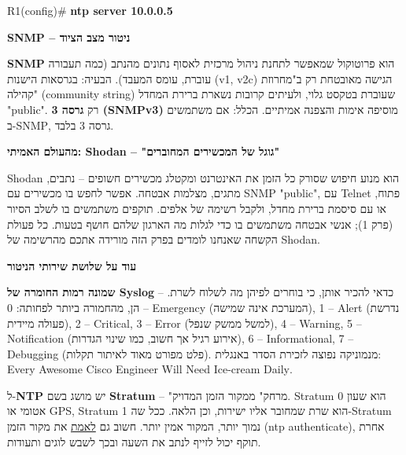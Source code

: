 \documentclass[11pt]{article}
\newcommand{\enLR}[1]{\textenglish{#1}}
\newcommand{\code}[1]{\textenglish{\codefont #1}}
\newcommand{\subheading}[1]{\vskip6pt{\bfseries\color{h3}#1\par}\vskip2pt}
\newcommand{\boxtitle}[1]{{\bfseries\color{boxti}#1}}
\newenvironment{storybox}{\colorlet{boxti}{stoti}\begin{mdframed}[backgroundcolor=stobg,linecolor=stofr,rightline=true,leftline=false,topline=false,bottomline=false,linewidth=2pt,innertopmargin=6pt,innerbottommargin=6pt,innerleftmargin=8pt,innerrightmargin=8pt,skipabove=6pt,skipbelow=6pt]}{\end{mdframed}}
\begin{document}
\begin{codebox}\begin{english}\codefont\footnotesize\color{cfg}\setlength{\parindent}{0pt}
R1(config)\# \textcolor{cbold}{\textbf{ntp server 10.0.0.5}}
\end{english}\end{codebox}

\subheading{\enLR{SNMP} – ניטור מצב הציוד}

\textbf{\enLR{SNMP}} הוא פרוטוקול שמאפשר לתחנת ניהול מרכזית לאסוף נתונים מהנתב (כמה תעבורה עוברת, עומס המעבד). הבעיה: בגרסאות הישנות \enLR{(v1, v2c)} הגישה מאובטחת רק ב"מחרוזת קהילה" \enLR{(community string)} שעוברת בטקסט גלוי, ולעיתים קרובות נשארת ברירת המחדל "\enLR{public".} רק \textbf{גרסה \enLR{3 (SNMPv3)}} מוסיפה אימות והצפנה אמיתיים. הכלל: אם משתמשים ב-\enLR{SNMP}, גרסה \enLR{3} בלבד.\par

\begin{storybox}\boxtitle{מהעולם האמיתי: \enLR{Shodan} – "גוגל של המכשירים המחוברים"}\par  \enLR{Shodan} הוא מנוע חיפוש שסורק כל הזמן את האינטרנט ומקטלג מכשירים חשופים – נתבים, מתגים, מצלמות אבטחה. אפשר לחפש בו מכשירים עם \enLR{SNMP "public"}, עם \enLR{Telnet} פתוח, או עם סיסמת ברירת מחדל, ולקבל רשימה של אלפים. תוקפים משתמשים בו לשלב הסיור (פרק \enLR{1)}; אנשי אבטחה משתמשים בו כדי לגלות מה הארגון שלהם חושף בטעות. כל פעולת הקשחה שאנחנו לומדים בפרק הזה מורידה אתכם מהרשימה של \enLR{Shodan.}\end{storybox}

\subheading{עוד על שלושת שירותי הניטור}

\textbf{שמונה רמות החומרה של \enLR{Syslog}} – כדאי להכיר אותן, כי בוחרים לפיהן מה לשלוח לשרת. הן, מהחמורה ביותר לפחותה: \enLR{0} – \enLR{Emergency} (המערכת אינה שמישה), \enLR{1} – \enLR{Alert} (נדרשת פעולה מיידית), \enLR{2} – \enLR{Critical, 3} – \enLR{Error} (למשל ממשק שנפל), \enLR{4} – \enLR{Warning, 5} – \enLR{Notification} (אירוע רגיל אך חשוב, כמו שינוי הגדרות), \enLR{6} – \enLR{Informational, 7} – \enLR{Debugging} (פלט מפורט מאוד לאיתור תקלות). מנמוניקה נפוצה לזכירת הסדר באנגלית: \enLR{Every Awesome Cisco Engineer Will Need Ice-cream Daily}.\par

ל-\textbf{\enLR{NTP}} יש מושג בשם \textbf{\enLR{Stratum}} – "מרחק" ממקור הזמן המדויק. \enLR{Stratum 0} הוא שעון אטומי או \enLR{GPS, Stratum 1} הוא שרת שמחובר אליו ישירות, וכן הלאה. ככל שה-\enLR{Stratum} נמוך יותר, המקור אמין יותר. חשוב גם \underline{לאמת} את מקור הזמן (\code{ntp authenticate}), אחרת תוקף יכול לזייף לנתב את השעה ובכך לשבש לוגים ותעודות.\par
\end{document}

